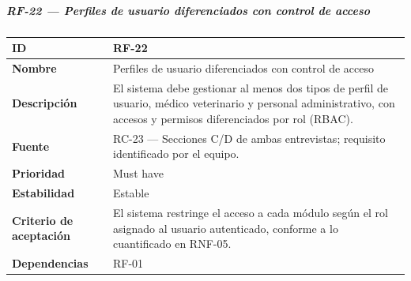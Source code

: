 \subparagraph{RF-22 --- Perfiles de usuario diferenciados con control de
acceso}\label{rf-22-perfiles-de-usuario-diferenciados-con-control-de-acceso}

{\def\LTcaptype{none} %
\begin{longtable}[]{@{}
  >{\raggedright\arraybackslash}p{}
  >{\raggedright\arraybackslash}p{}@{}}
\toprule\noalign{}
\begin{minipage}[b]{\linewidth}\raggedright
\textbf{ID}
\end{minipage} & \begin{minipage}[b]{\linewidth}\raggedright
RF-22
\end{minipage} \\
\midrule\noalign{}
\endhead
\bottomrule\noalign{}
\endlastfoot
\textbf{Nombre} & \begin{minipage}[t]{\linewidth}\raggedright
Perfiles de usuario diferenciados con control de acceso
\end{minipage} \\
\textbf{Descripción} & \begin{minipage}[t]{\linewidth}\raggedright
El sistema debe gestionar al menos dos tipos de perfil de usuario,
médico veterinario y personal administrativo, con accesos y permisos
diferenciados por rol (RBAC).
\end{minipage} \\
\textbf{Fuente} & \begin{minipage}[t]{\linewidth}\raggedright
RC-23 --- Secciones C/D de ambas entrevistas; requisito identificado por
el equipo.
\end{minipage} \\
\textbf{Prioridad} & \begin{minipage}[t]{\linewidth}\raggedright
Must have
\end{minipage} \\
\textbf{Estabilidad} & \begin{minipage}[t]{\linewidth}\raggedright
Estable
\end{minipage} \\
\textbf{Criterio de aceptación} &
\begin{minipage}[t]{\linewidth}\raggedright
El sistema restringe el acceso a cada módulo según el rol asignado al
usuario autenticado, conforme a lo cuantificado en RNF-05.
\end{minipage} \\
\textbf{Dependencias} & \begin{minipage}[t]{\linewidth}\raggedright
RF-01
\end{minipage} \\
\end{longtable}
}

